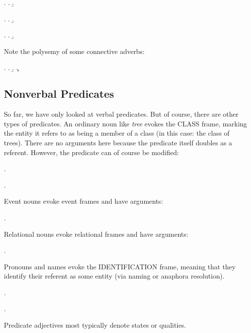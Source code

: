 \documentclass[a4paper]{article}
\newcommand{\fr}[1]{\textsf{#1}}
\begin{document}
\ex.
\a.
\b.

\ex.
\a.
\b.

\ex.
\a.
\b.

Note the polysemy of some connective adverbs:

\ex.
\a.
\b.
\c.


\newpage\subsection{Nonverbal Predicates}

So far, we have only looked at verbal predicates. But of course, there are
other types of predicates. An ordinary noun like \emph{tree} evokes the
\fr{CLASS} frame, marking the entity it refers to as being a member of a class
(in this case: the class of trees). There are no arguments here because the
predicate itself doubles as a referent. However, the predicate can of course be
modified:

\ex.

\ex.

Event nouns evoke event frames and have arguments:

\ex.

Relational nouns evoke relational frames and have arguments:

\ex.

Pronouns and names evoke the \fr{IDENTIFICATION} frame, meaning that they
identify their referent as some entity (via naming or anaphora resolution).

\ex.

\ex.

Predicate adjectives most typically denote states or qualities.
\end{document}
